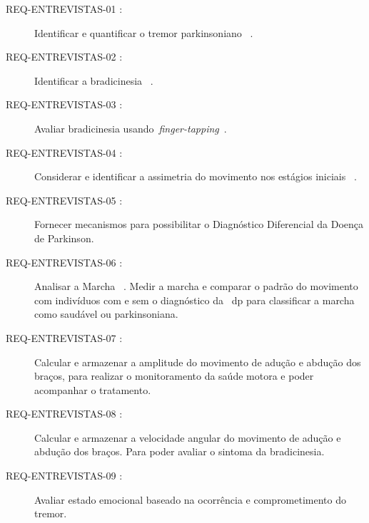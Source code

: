 \begin{description}
	\item[REQ-ENTREVISTAS-01 :] Identificar e quantificar o tremor parkinsoniano ~\cite{tolosa06,keijsers2006,lemoyne2010}.
	\item[REQ-ENTREVISTAS-02 :] Identificar a bradicinesia ~\cite{patel_monitoring_2009}. %
	\item[REQ-ENTREVISTAS-03 :] Avaliar bradicinesia usando~\textit{finger-tapping}~\cite{finger2012}.
	\item[REQ-ENTREVISTAS-04 :] Considerar e identificar a assimetria do movimento nos estágios iniciais ~\cite{national2006parkinson}.	%
	\item[REQ-ENTREVISTAS-05 :] Fornecer mecanismos para possibilitar o Diagnóstico Diferencial \cite{protpar010} da Doença de Parkinson. %
	\item[REQ-ENTREVISTAS-06 :] Analisar a Marcha ~\cite{gaitusingsensorsreview2012}. Medir a marcha e comparar o padrão do movimento com indivíduos com e sem o diagnóstico da ~\ac{dp} para classificar a marcha como saudável ou parkinsoniana.
	\item[REQ-ENTREVISTAS-07 :] Calcular e armazenar a amplitude do movimento de adução e abdução dos braços, para realizar o monitoramento da saúde motora e poder acompanhar o tratamento.
	\item[REQ-ENTREVISTAS-08 :] Calcular e armazenar a velocidade angular do movimento de adução e abdução dos braços. Para poder avaliar o sintoma da bradicinesia.
	\item[REQ-ENTREVISTAS-09 :] Avaliar estado emocional baseado na ocorrência e comprometimento do tremor. 
\end{description}



